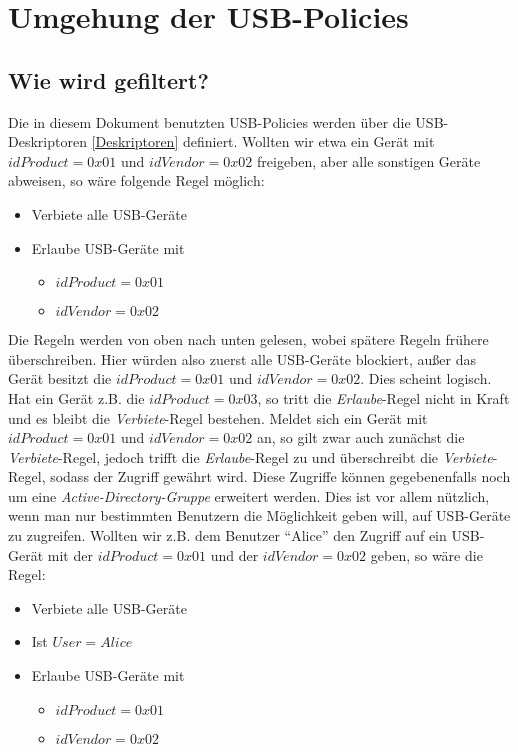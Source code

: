 \chapter{Umgehung der USB-Policies}\label{Angriff}

\section{Wie wird gefiltert?}
Die in diesem Dokument benutzten USB-Policies werden über die USB-Deskriptoren \ref{Deskriptoren} definiert. Wollten wir etwa ein Gerät mit $idProduct=0x01$ und $idVendor=0x02$ freigeben, aber alle sonstigen Geräte abweisen, so wäre folgende Regel möglich:
			\begin{itemize}
				\item Verbiete alle USB-Geräte
				\item Erlaube USB-Geräte mit
				\begin{itemize}
					\item $idProduct=0x01$
					\item $idVendor=0x02$
				\end{itemize}
			\end{itemize}
Die Regeln werden von oben nach unten gelesen, wobei spätere Regeln frühere überschreiben. Hier würden also zuerst alle USB-Geräte blockiert, außer das Gerät besitzt die $idProduct=0x01$ und $idVendor=0x02$. Dies scheint logisch. Hat ein Gerät z.B. die $idProduct=0x03$, so tritt die \textit{Erlaube}-Regel nicht in Kraft und es bleibt die \textit{Verbiete}-Regel bestehen. Meldet sich ein Gerät mit $idProduct=0x01$ und $idVendor=0x02$ an, so gilt zwar auch zunächst die \textit{Verbiete}-Regel, jedoch trifft die \textit{Erlaube}-Regel zu und überschreibt die \textit{Verbiete}-Regel, sodass der Zugriff gewährt wird.
Diese Zugriffe können gegebenenfalls noch um eine \textit{Active-Directory-Gruppe} erweitert werden. Dies ist vor allem nützlich, wenn man nur bestimmten Benutzern die Möglichkeit geben will, auf USB-Geräte zu zugreifen. Wollten wir z.B. dem Benutzer "`Alice"' den Zugriff auf ein USB-Gerät mit der $idProduct=0x01$ und der $idVendor=0x02$ geben, so wäre die Regel:
			\begin{itemize}
				\item Verbiete alle USB-Geräte
				\item Ist $User=Alice$
				\item Erlaube USB-Geräte mit
				\begin{itemize}
					\item $idProduct=0x01$
					\item $idVendor=0x02$
				\end{itemize} 
			\end{itemize}

